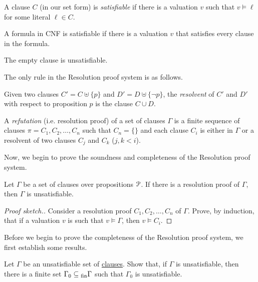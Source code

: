 \documentclass[11pt,usenames, dvipsnames]{article}
\begin{document}
\begin{definition}[Satisfiability]
  A clause $C$ (in our set form) is \emph{satisfiable} if there is a valuation $v$ such that $v \models \ell$ for some literal $\ell \in C$.

  A formula in CNF is satisfiable if there is a valuation $v$ that satisfies every clause in the formula.
\end{definition}

\begin{remark}
  The empty clause is unsatisfiable.
\end{remark}

The only rule in the Resolution proof system is as follows.

\begin{definition}[Resolvent]
  Given two clauses $C' = C \uplus \{p\}$ and $D' = D \uplus \{\neg p\}$, the \emph{resolvent} of $C'$ and $D'$ with respect to proposition $p$ is the clause $C \cup D$.
\end{definition}

\begin{definition}
  A \emph{refutation} (i.e. resolution proof) of a set of clauses $\Gamma$ is a finite sequence of clauses $\pi = C_1, C_2, \ldots, C_n$ such that $C_n = \{\}$ and each clause $C_i$ is either in $\Gamma$ or a resolvent of two clauses $C_j$ and $C_k$ ($j, k < i$).
\end{definition}

Now, we begin to prove the soundness and completeness of the Resolution proof system.

\begin{theorem}
  Let $\Gamma$ be a set of clauses over propositions $\props$. If there is a resolution proof of $\Gamma$, then $\Gamma$ is unsatisfiable.
\end{theorem}

\begin{proof}[Proof sketch.]
  Consider a resolution proof $C_1, C_2, \ldots, C_n$ of $\Gamma$. Prove, by induction, that if a valuation $v$ is such that $v \models \Gamma$, then $v \models C_i$. 
\end{proof}

Before we begin to prove the completeness of the Resolution proof system, we first establish some results.

\begin{claim}
  Let $\Gamma$ be an unsatisfiable set of \underline{clauses}. Show that, if $\Gamma$ is unsatisfiable, then there is a finite set $\Gamma_0 \subseteq\textsubscript{fin} \Gamma$ such that $\Gamma_0$ is unsatisfiable.
\end{claim}
\end{document}
